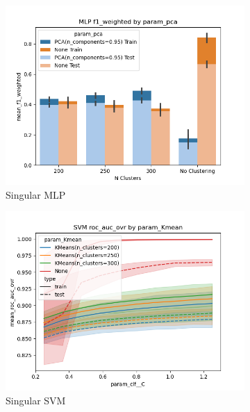 \documentclass[12pt]{article}
\begin{document}
\begin{figure}
\begin{subfigure}{.5\textwidth}
      \includegraphics[width=.95\textwidth]{../../results_Experiment5_Final_No_Agg/mlp/param_pca_f1_weighted_param_Kmean.png}
      \caption{Singular MLP}
      \end{subfigure}%
    \begin{subfigure}{.5\textwidth}
      \includegraphics[width=.95\textwidth]{../../results_Experiment5_Final_No_Agg/svm/param_Kmean_roc_auc_ovr_param_clf__C.png}
      \caption{Singular SVM}
    \end{subfigure}
    \begin{subfigure}{.5\textwidth}

\end{subfigure}
\end{figure}
\end{document}
